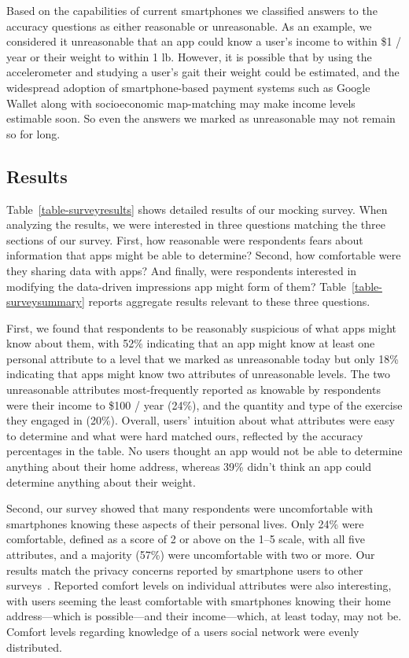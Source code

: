 Based on the capabilities of current smartphones we classified answers to the
accuracy questions as either reasonable or unreasonable. As an example, we
considered it unreasonable that an app could know a user's income to within
\$1 / year or their weight to within 1 lb. However, it is possible that by
using the accelerometer and studying a user's gait their weight could be
estimated, and the widespread adoption of smartphone-based payment systems
such as Google Wallet along with socioeconomic map-matching may make income
levels estimable soon. So even the answers we marked as unreasonable may not
remain so for long.

\subsection{Results}
\label{subsec-surveyresults}

Table~\ref{table-surveyresults} shows detailed results of our mocking survey.
When analyzing the results, we were interested in three questions matching
the three sections of our survey. First, how reasonable were respondents
fears about information that apps might be able to determine? Second, how
comfortable were they sharing data with apps? And finally, were respondents
interested in modifying the data-driven impressions app might form of them?
Table~\ref{table-surveysummary} reports aggregate results relevant to these
three questions.

First, we found that respondents to be reasonably suspicious of what apps
might know about them, with 52\% indicating that an app might know at least
one personal attribute to a level that we marked as unreasonable today but
only 18\% indicating that apps might know two attributes of unreasonable
levels. The two unreasonable attributes most-frequently reported as knowable
by respondents were their income to \$100 / year (24\%), and the quantity and
type of the exercise they engaged in (20\%). Overall, users' intuition about
what attributes were easy to determine and what were hard matched ours,
reflected by the accuracy percentages in the table. No users thought an
app would not be able to determine anything about their home address,
whereas 39\% didn't think an app could determine anything about their weight.

Second, our survey showed that many respondents were uncomfortable with
smartphones knowing these aspects of their personal lives. Only 24\% were
comfortable, defined as a score of 2 or above on the 1--5 scale, with all
five attributes, and a majority (57\%) were uncomfortable with two or more.
Our results match the privacy concerns reported by smartphone users to other
surveys~\cite{truste-privacy}. Reported comfort levels on individual
attributes were also interesting, with users seeming the least comfortable
with smartphones knowing their home address---which is possible---and their
income---which, at least today, may not be. Comfort levels regarding
knowledge of a users social network were evenly distributed.

